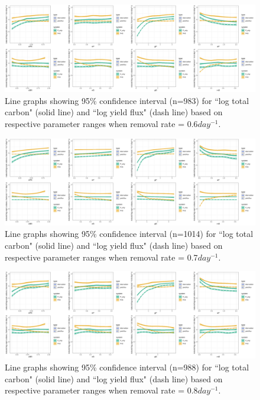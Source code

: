 \documentclass[../thesis.tex]{subfiles} %
\begin{document}
\begin{figure}[H]
    \centering
    \includegraphics[width=\linewidth]{../result/var_06.png}
    \caption[95\% distribution for $x=0.6day^{-1}$]{Line graphs showing 95\% confidence interval (n=983) for ``log total carbon" (solid line) and ``log yield flux" (dash line) based on respective parameter ranges when removal rate = 0.6$day^{-1}$.}
    \label{fig:v06}
\end{figure}

\begin{figure}[H]
    \centering
    \includegraphics[width=\linewidth]{../result/var_07.png}
    \caption[95\% distribution for $x=0.7day^{-1}$]{Line graphs showing 95\% confidence interval (n=1014) for ``log total carbon" (solid line) and ``log yield flux" (dash line) based on respective parameter ranges when removal rate = 0.7$day^{-1}$.}
    \label{fig:v07}
\end{figure}

\begin{figure}[H]
    \centering
    \includegraphics[width=\linewidth]{../result/var_08.png}
    \caption[95\% distribution for $x=0.8day^{-1}$]{Line graphs showing 95\% confidence interval (n=988) for ``log total carbon" (solid line) and ``log yield flux" (dash line) based on respective parameter ranges when removal rate = 0.8$day^{-1}$.}
    \label{fig:v08}
\end{figure}
\end{document}
